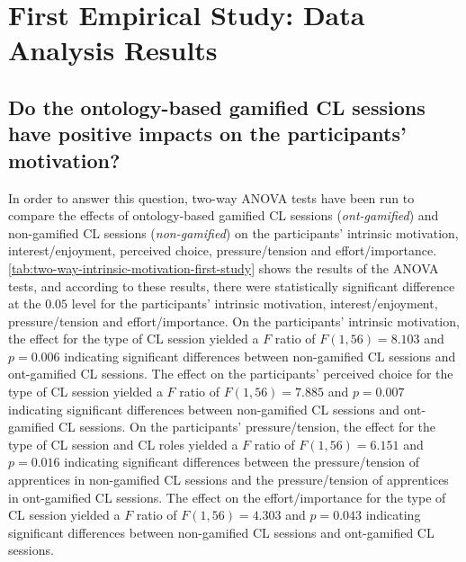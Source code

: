 \section{First Empirical Study: Data Analysis Results}
\label{sec:first-study}

\subsection*{Do the ontology-based gamified CL sessions have positive impacts on the participants' motivation?}

In order to answer this question, 
two-way ANOVA tests have been run to compare the effects of ontology-based gamified CL sessions (\emph{ont-gamified}) and non-gamified CL sessions (\emph{non-gamified}) on the participants' intrinsic motivation, interest/enjoyment, perceived choice, pressure/tension and effort/importance.
\autoref{tab:two-way-intrinsic-motivation-first-study} shows the results of the ANOVA tests, and 
according to these results, there were statistically significant difference at the $0.05$ level for the participants' intrinsic motivation, interest/enjoyment, pressure/tension and effort/importance. On the participants' intrinsic motivation, the effect for the type of CL session yielded a $F$ ratio of $F(1,56) = 8.103$ and $p = 0.006$ indicating significant differences between non-gamified CL sessions and ont-gamified CL sessions. The effect on the participants' perceived choice for the type of CL session yielded a $F$ ratio of $F(1,56) = 7.885$ and $p = 0.007$ indicating significant differences between non-gamified CL sessions and ont-gamified CL sessions. On the participants' pressure/tension, the effect for the type of CL session and CL roles yielded a $F$ ratio of $F(1,56) = 6.151$ and $p = 0.016$ indicating significant differences between the pressure/tension of apprentices in non-gamified CL sessions and the pressure/tension of apprentices in ont-gamified CL sessions. The effect on the effort/importance for the type of CL session yielded a $F$ ratio of $F(1,56) = 4.303$ and $p = 0.043$ indicating significant differences between non-gamified CL sessions and ont-gamified CL sessions.


